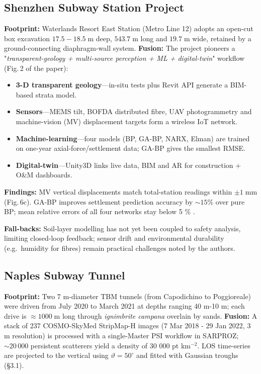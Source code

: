\documentclass[preprint,11pt,authoryear,3p]{elsarticle}
\begin{document}
\subsection{Shenzhen Subway Station Project}
\label{subsec:shenzhen_case}

\textbf{Footprint:} Waterlands Resort East Station (Metro Line 12) adopts an open-cut box excavation \(17.5\!-\!18.5\;\mathrm{m}\) deep, \(543.7\;\mathrm{m}\) long and \(19.7\;\mathrm{m}\) wide, retained by a ground-connecting diaphragm-wall system. \textbf{Fusion:} The project pioneers a "\textit{transparent-geology + multi-source perception + ML + digital-twin}" workflow (Fig.\,2 of the paper):

\begin{itemize}
  \item \textbf{3-D transparent geology}—in-situ tests plus Revit API
        generate a BIM-based strata model.
  \item \textbf{Sensors}—MEMS tilt, BOFDA distributed fibre, UAV
        photogrammetry and machine-vision (MV) displacement targets
        form a wireless IoT network.
  \item \textbf{Machine-learning}—four models (BP, GA-BP, NARX, Elman)
        are trained on one-year axial-force/settlement data; GA-BP gives the
        smallest RMSE.
  \item \textbf{Digital-twin}—Unity3D links live data, BIM and AR for
        construction + O\&M dashboards.
\end{itemize}

\textbf{Findings:} MV vertical displacements match total-station readings within $\pm1\;\mathrm{mm}$ (Fig.\,6c). GA-BP improves settlement prediction accuracy by $\sim15\%$ over pure BP; mean relative errors of all four networks stay below 5 \% .

\textbf{Fall-backs:} Soil-layer modelling has not yet been coupled to safety analysis, limiting closed-loop feedback; sensor drift and environmental durability (e.g.\ humidity for fibres) remain practical challenges noted by the authors.

\subsection{Naples Subway Tunnel}
\label{subsec:naples_case}

\textbf{Footprint:} Two 7 m-diameter TBM tunnels (from Capodichino to Poggioreale) were driven from July 2020 to March 2021 at depths ranging 40 m-10 m; each drive is $\approx1000\;\mathrm{m}$ long through \emph{ignimbrite campana} overlain by sands. \textbf{Fusion:} A stack of 237 COSMO-SkyMed StripMap-H images (7 Mar 2018 - 29 Jan 2022, 3 m resolution) is processed with a single-Master PSI workflow in SARPROZ; $\sim 20\,000$ persistent scatterers yield a density of 30 000 pt km\(^{-2}\). LOS time-series are projected to the vertical using $\vartheta\!=\!50^{\circ}$ and fitted with Gaussian troughs (§3.1).
\end{document}
